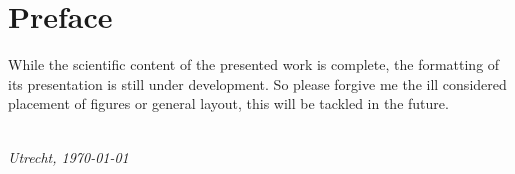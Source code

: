 
\chapter*{Preface}






While the scientific content of the presented work is complete, the formatting of its presentation is still under development.
So please forgive me the ill considered placement of figures or general layout, this will be tackled in the future.




\begin{flushright}
{\makeatletter\itshape
    \@firstname\ \@lastname \\
    Utrecht, \monthyeardate\today
\makeatother}
\end{flushright}

